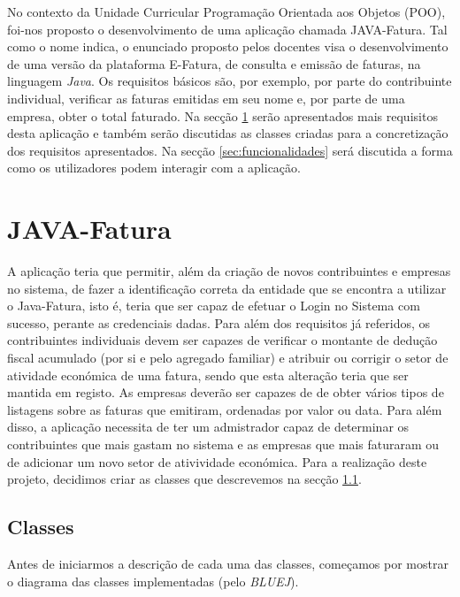 \documentclass[a4paper]{article}
\begin{document}
No contexto da Unidade Curricular Programação Orientada aos Objetos (POO), foi-nos proposto o desenvolvimento de uma aplicação chamada JAVA-Fatura. 
Tal como o nome indica, o enunciado proposto pelos docentes visa o desenvolvimento de uma versão da plataforma E-Fatura, de consulta e emissão de faturas,
na linguagem \textit{Java}.
Os requisitos básicos são, por exemplo, por parte do contribuinte individual, verificar as faturas 
emitidas em seu nome e, por parte de uma empresa, obter o total faturado.
Na secção \ref{sec:java} serão apresentados mais requisitos desta aplicação e também serão discutidas as classes 
criadas para a concretização dos requisitos apresentados.
Na secção \ref{sec:funcionalidades} será discutida a forma como os utilizadores podem interagir com a aplicação.


\section{JAVA-Fatura}
\label{sec:java}

A aplicação teria que permitir, além da criação de novos contribuintes e empresas no sistema, de fazer a identificação correta da entidade que se encontra a utilizar o Java-Fatura, isto é, teria que ser capaz de efetuar o Login no Sistema com sucesso, perante as credenciais dadas.
Para além dos requisitos já referidos, os contribuintes individuais devem ser capazes de verificar o montante de dedução fiscal acumulado (por si
e pelo agregado familiar) e atribuir ou corrigir o setor de atividade económica de uma fatura, sendo que esta alteração teria que ser mantida em registo. 
As empresas deverão ser capazes de de obter
vários tipos de listagens sobre as faturas que emitiram, ordenadas por valor ou data. Para além disso, a aplicação necessita de ter um admistrador capaz 
de determinar os contribuintes que mais gastam no sistema e as empresas que mais faturaram ou de adicionar um novo setor de ativividade económica. Para a realização deste projeto, decidimos criar as classes que descrevemos na secção \ref{sec:classes}.
	

\subsection{Classes}
\label{sec:classes}

Antes de iniciarmos a descrição de cada uma das classes, começamos por mostrar o diagrama das classes implementadas (pelo \textit{BLUEJ}).
\end{document}
